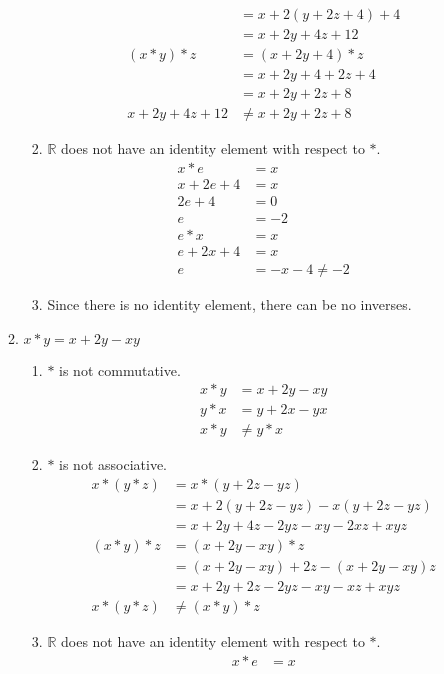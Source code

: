 \begin{enumerate}[label={\Alph*.},font={\bfseries}]
\begin{enumerate}[label={\arabic*},font={\bfseries}]
\begin{enumerate}[label={(\roman*)}]
\begin{align*}
        &= x+2(y+2z+4)+4 \\
        &= x+2y+4z+12 \\
        (x*y)*z &= (x+2y+4)*z \\
        &= x+2y+4+2z+4 \\
        &= x+2y+2z+8 \\
        x+2y+4z+12 &\neq x+2y+2z+8
      \end{align*}
    \item $\mathbb{R}$ does not have an identity element with respect to $*$.
      \begin{align*}
        x*e &= x \\
        x+2e+4 &= x \\
        2e+4 &= 0 \\
        e &= -2 \\
        e*x &= x \\
        e+2x+4 &= x \\
        e &= -x-4 \neq -2
      \end{align*}
    \item Since there is no identity element, there can be no inverses.
    \end{enumerate}
  \item $x*y=x+2y-xy$
    \begin{enumerate}[label={(\roman*)}]
    \item $*$ is not commutative.
      \begin{align*}
        x*y &= x+2y-xy \\
        y*x &= y+2x-yx \\
        x*y &\neq y*x
      \end{align*}
    \item $*$ is not associative.
      \begin{align*}
        x*(y*z) &= x*(y+2z-yz) \\
        &= x+2(y+2z-yz)-x(y+2z-yz) \\
        &= x+2y+4z-2yz-xy-2xz+xyz \\
        (x*y)*z &= (x+2y-xy)*z \\
        &=(x+2y-xy)+2z-(x+2y-xy)z \\
        &=x+2y+2z-2yz-xy-xz+xyz \\
        x*(y*z) &\neq (x*y)*z
      \end{align*}
    \item $\mathbb{R}$ does not have an identity element with respect to $*$.
      \begin{align*}
        x*e &= x \\

\end{align*}
\end{enumerate}
\end{enumerate}
\end{enumerate}
